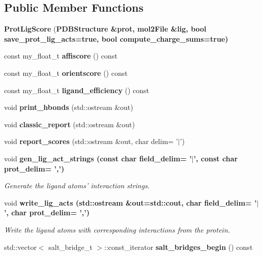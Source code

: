 \subsection*{Public Member Functions}
\begin{CompactItemize}
\item 
\textbf{Prot\-Lig\-Score} (\bf{PDBStructure} \&prot, \bf{mol2File} \&lig, bool save\_\-prot\_\-lig\_\-acts=true, bool compute\_\-charge\_\-sums=true)\label{classSimSite3D_1_1ProtLigScore_1770dc58245d85131f7040e5acffdeff}

\item 
const my\_\-float\_\-t \textbf{affiscore} () const \label{classSimSite3D_1_1ProtLigScore_3b141a7e5ba3c877356e268809133520}

\item 
const my\_\-float\_\-t \textbf{orientscore} () const \label{classSimSite3D_1_1ProtLigScore_5d08bfc7c970cb20a8418452c70f676e}

\item 
const my\_\-float\_\-t \textbf{ligand\_\-efficiency} () const \label{classSimSite3D_1_1ProtLigScore_1f92dc0a2b0830b392f6f5648e6e316b}

\item 
void \textbf{print\_\-hbonds} (std::ostream \&out)\label{classSimSite3D_1_1ProtLigScore_2632d23a6e61c4c16781bf8fe9323fda}

\item 
void \textbf{classic\_\-report} (std::ostream \&out)\label{classSimSite3D_1_1ProtLigScore_60120a05bc1c6cd704174e08e3110ba1}

\item 
void \textbf{report\_\-scores} (std::ostream \&out, char delim= '$|$')\label{classSimSite3D_1_1ProtLigScore_908635d9e01981a9e813df7947505f3d}

\item 
void \bf{gen\_\-lig\_\-act\_\-strings} (const char field\_\-delim= '$|$', const char prot\_\-delim= ',')
\begin{CompactList}\small\item\em Generate the ligand atoms' interaction strings. \item\end{CompactList}\item 
void \bf{write\_\-lig\_\-acts} (std::ostream \&out=std::cout, char field\_\-delim= '$|$', char prot\_\-delim= ',')\label{classSimSite3D_1_1ProtLigScore_1433bfcfed24d1a064ad4ead1f5e6a47}

\begin{CompactList}\small\item\em Write the ligand atoms with corresponding interactions from the protein. \item\end{CompactList}\item 
std::vector$<$ salt\_\-bridge\_\-t $>$::const\_\-iterator \textbf{salt\_\-bridges\_\-begin} () const \label{classSimSite3D_1_1ProtLigScore_91e6b0e118597d22d6a7cd4deecc45da}


\end{CompactItemize}
